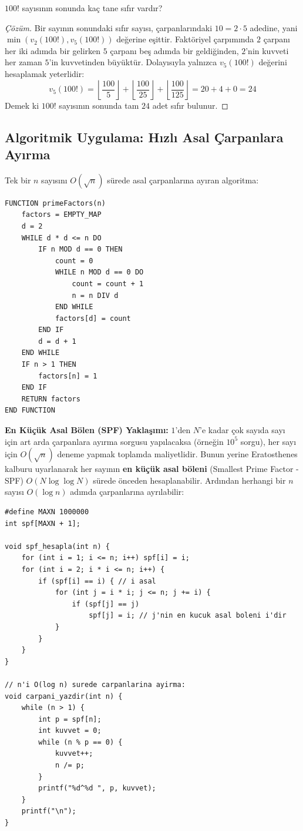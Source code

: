 \begin{example}
$100!$ sayısının sonunda kaç tane sıfır vardır?
\end{example}
\begin{proof}[Çözüm]
Bir sayının sonundaki sıfır sayısı, çarpanlarındaki $10 = 2 \cdot 5$ adedine, yani $\min(v_2(100!), v_5(100!))$ değerine eşittir. Faktöriyel çarpımında $2$ çarpanı her iki adımda bir gelirken $5$ çarpanı beş adımda bir geldiğinden, $2$'nin kuvveti her zaman $5$'in kuvvetinden büyüktür. Dolayısıyla yalnızca $v_5(100!)$ değerini hesaplamak yeterlidir:
\[ v_5(100!) = \left\lfloor \frac{100}{5} \right\rfloor + \left\lfloor \frac{100}{25} \right\rfloor + \left\lfloor \frac{100}{125} \right\rfloor = 20 + 4 + 0 = 24 \]
Demek ki $100!$ sayısının sonunda tam $24$ adet sıfır bulunur.
\end{proof}

\subsection{Algoritmik Uygulama: Hızlı Asal Çarpanlara Ayırma}

Tek bir $n$ sayısını $O(\sqrt{n})$ sürede asal çarpanlarına ayıran algoritma:

\begin{lstlisting}
FUNCTION primeFactors(n)
    factors = EMPTY_MAP
    d = 2
    WHILE d * d <= n DO
        IF n MOD d == 0 THEN
            count = 0
            WHILE n MOD d == 0 DO
                count = count + 1
                n = n DIV d
            END WHILE
            factors[d] = count
        END IF
        d = d + 1
    END WHILE
    IF n > 1 THEN
        factors[n] = 1
    END IF
    RETURN factors
END FUNCTION\end{lstlisting}

\textbf{En Küçük Asal Bölen (SPF) Yaklaşımı:}
$1$'den $N$'e kadar çok sayıda sayı için art arda çarpanlara ayırma sorgusu yapılacaksa (örneğin $10^5$ sorgu), her sayı için $O(\sqrt{n})$ deneme yapmak toplamda maliyetlidir. Bunun yerine Eratosthenes kalburu uyarlanarak her sayının \textbf{en küçük asal böleni} (Smallest Prime Factor - SPF) $O(N \log \log N)$ sürede önceden hesaplanabilir. Ardından herhangi bir $n$ sayısı $O(\log n)$ adımda çarpanlarına ayrılabilir:

\begin{lstlisting}[language=CTemel]
#define MAXN 1000000
int spf[MAXN + 1];

void spf_hesapla(int n) {
    for (int i = 1; i <= n; i++) spf[i] = i;
    for (int i = 2; i * i <= n; i++) {
        if (spf[i] == i) { // i asal
            for (int j = i * i; j <= n; j += i) {
                if (spf[j] == j)
                    spf[j] = i; // j'nin en kucuk asal boleni i'dir
            }
        }
    }
}

// n'i O(log n) surede carpanlarina ayirma:
void carpani_yazdir(int n) {
    while (n > 1) {
        int p = spf[n];
        int kuvvet = 0;
        while (n % p == 0) {
            kuvvet++;
            n /= p;
        }
        printf("%d^%d ", p, kuvvet);
    }
    printf("\n");
}
\end{lstlisting}

